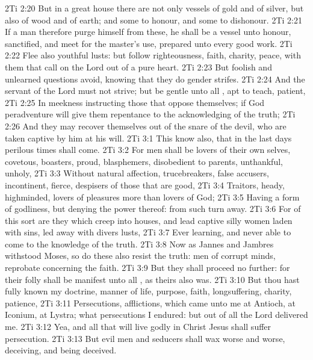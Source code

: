 \vs 2Ti 2:20 But in a great house there are not only vessels of gold and of silver, but also of wood and of earth; and some to honour, and some to dishonour.
\vs 2Ti 2:21 If a man therefore purge himself from these, he shall be a vessel unto honour, sanctified, and meet for the master's use,  prepared unto every good work.
\vs 2Ti 2:22 Flee also youthful lusts: but follow righteousness, faith, charity, peace, with them that call on the Lord out of a pure heart.
\vs 2Ti 2:23 But foolish and unlearned questions avoid, knowing that they do gender strifes.
\vs 2Ti 2:24 And the servant of the Lord must not strive; but be gentle unto all , apt to teach, patient,
\vs 2Ti 2:25 In meekness instructing those that oppose themselves; if God peradventure will give them repentance to the acknowledging of the truth;
\vs 2Ti 2:26 And  they may recover themselves out of the snare of the devil, who are taken captive by him at his will.
\vs 2Ti 3:1 This know also, that in the last days perilous times shall come.
\vs 2Ti 3:2 For men shall be lovers of their own selves, covetous, boasters, proud, blasphemers, disobedient to parents, unthankful, unholy,
\vs 2Ti 3:3 Without natural affection, trucebreakers, false accusers, incontinent, fierce, despisers of those that are good,
\vs 2Ti 3:4 Traitors, heady, highminded, lovers of pleasures more than lovers of God;
\vs 2Ti 3:5 Having a form of godliness, but denying the power thereof: from such turn away.
\vs 2Ti 3:6 For of this sort are they which creep into houses, and lead captive silly women laden with sins, led away with divers lusts,
\vs 2Ti 3:7 Ever learning, and never able to come to the knowledge of the truth.
\vs 2Ti 3:8 Now as Jannes and Jambres withstood Moses, so do these also resist the truth: men of corrupt minds, reprobate concerning the faith.
\vs 2Ti 3:9 But they shall proceed no further: for their folly shall be manifest unto all , as theirs also was.
\vs 2Ti 3:10 But thou hast fully known my doctrine, manner of life, purpose, faith, longsuffering, charity, patience,
\vs 2Ti 3:11 Persecutions, afflictions, which came unto me at Antioch, at Iconium, at Lystra; what persecutions I endured: but out of  all the Lord delivered me.
\vs 2Ti 3:12 Yea, and all that will live godly in Christ Jesus shall suffer persecution.
\vs 2Ti 3:13 But evil men and seducers shall wax worse and worse, deceiving, and being deceived.
